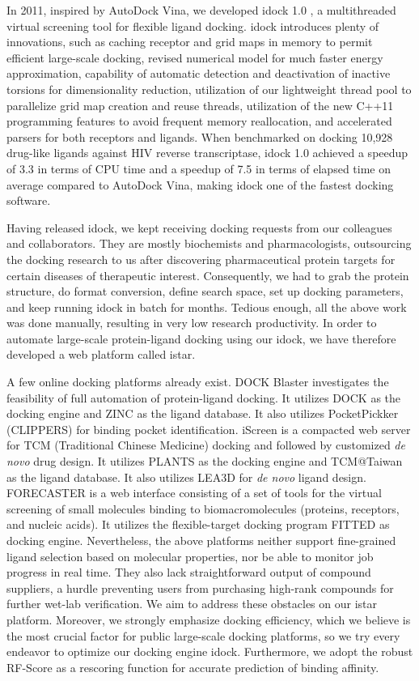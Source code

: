 \documentclass[10pt]{article}
\begin{document}
In 2011, inspired by AutoDock Vina, we developed idock 1.0 \cite{1153}, a multithreaded virtual screening tool for flexible ligand docking. idock introduces plenty of innovations, such as caching receptor and grid maps in memory to permit efficient large-scale docking, revised numerical model for much faster energy approximation, capability of automatic detection and deactivation of inactive torsions for dimensionality reduction, utilization of our lightweight thread pool to parallelize grid map creation and reuse threads, utilization of the new C++11 programming features to avoid frequent memory reallocation, and accelerated parsers for both receptors and ligands. When benchmarked on docking 10,928 drug-like ligands against HIV reverse transcriptase, idock 1.0 achieved a speedup of 3.3 in terms of CPU time and a speedup of 7.5 in terms of elapsed time on average compared to AutoDock Vina, making idock one of the fastest docking software.

Having released idock, we kept receiving docking requests from our colleagues and collaborators. They are mostly biochemists and pharmacologists, outsourcing the docking research to us after discovering pharmaceutical protein targets for certain diseases of therapeutic interest. Consequently, we had to grab the protein structure, do format conversion, define search space, set up docking parameters, and keep running idock in batch for months. Tedious enough, all the above work was done manually, resulting in very low research productivity. In order to automate large-scale protein-ligand docking using our idock, we have therefore developed a web platform called istar.

A few online docking platforms already exist. DOCK Blaster \cite{557} investigates the feasibility of full automation of protein-ligand docking. It utilizes DOCK \cite{1222} as the docking engine and ZINC \cite{532,1178} as the ligand database. It also utilizes PocketPickker (CLIPPERS) \cite{395} for binding pocket identification. iScreen \cite{899} is a compacted web server for TCM (Traditional Chinese Medicine) docking and followed by customized \textit{de novo} drug design. It utilizes PLANTS \cite{610,607,779} as the docking engine and TCM@Taiwan \cite{528} as the ligand database. It also utilizes LEA3D \cite{1223} for \textit{de novo} ligand design. FORECASTER \cite{1012} is a web interface consisting of a set of tools for the virtual screening of small molecules binding to biomacromolecules (proteins, receptors, and nucleic acids). It utilizes the flexible-target docking program FITTED \cite{602} as docking engine. Nevertheless, the above platforms neither support fine-grained ligand selection based on molecular properties, nor be able to monitor job progress in real time. They also lack straightforward output of compound suppliers, a hurdle preventing users from purchasing high-rank compounds for further wet-lab verification. We aim to address these obstacles on our istar platform. Moreover, we strongly emphasize docking efficiency, which we believe is the most crucial factor for public large-scale docking platforms, so we try every endeavor to optimize our docking engine idock. Furthermore, we adopt the robust RF-Score \cite{564} as a rescoring function for accurate prediction of binding affinity.
\end{document}
